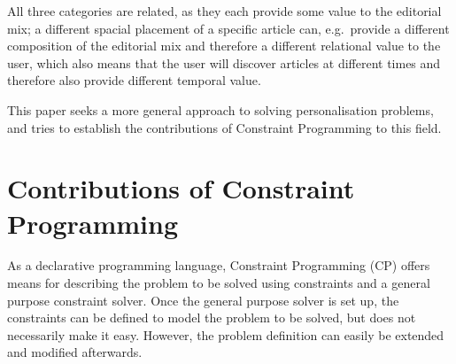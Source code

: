 All three categories are related, as they each provide some value to the editorial mix; a different spacial placement of a specific article can, e.g.\ provide a different composition of the editorial mix and therefore a different relational value to the user, which also means that the user will discover articles at different times and therefore also provide different temporal value.

This paper seeks a more general approach to solving personalisation problems, and tries to establish the contributions of Constraint Programming to this field.

\section{Contributions of Constraint Programming}
%
%
As a declarative programming language, Constraint Programming (CP) offers means for describing the problem to be solved using constraints and a general purpose constraint solver. Once the general purpose solver is set up, the constraints can be defined to model the problem to be solved, but does not necessarily make it easy. However, the problem definition can easily be extended and modified afterwards.

